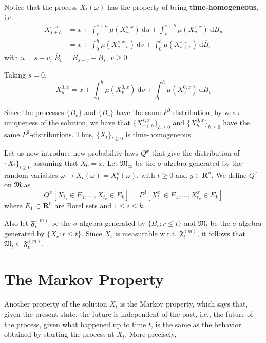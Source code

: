 Notice that the process $X_t(\omega)$ has the property of being \textbf{time-homogeneous}, i.e. 
\begin{equation*}
    \begin{aligned}
        X_{s+h}^{s,x} &= x + \int_s^{s+h} \mu(X_u^{s,x})~\mathrm{d}u + \int_s^{s+h} \mu(X_u^{s,x})~\mathrm{d}B_u \\
        &= x + \int_0^{h} \mu(X_{s+v}^{s,x})~\mathrm{d}v + \int_0^{h} \mu(X_{s+v}^{s,x})~\mathrm{d}\overline{B}_v
    \end{aligned} 
\end{equation*}
with $u = s+v$, $\overline{B}_v = B_{s+v} - B_s$, $v \geq 0$. 

Taking $s = 0$, 
\[
    X_{h}^{0,x} = x + \int_0^{h} \mu(X_{v}^{0,x})~\mathrm{d}v + \int_0^{h} \mu(X_{v}^{0,x})~\mathrm{d}B_v
\]

Since the processes $\{ \overline{B}_v \}$ and $\{ B_v \}$ have the same $P^0$-distribution, by weak uniqueness of the solution, we have that $\{ X_{s+h}^{s,x} \}_{h \geq 0}$ and $\{ X_h^{0,x} \}_{h \geq 0}$ have the same $P^0$-distributions. Thus, $\{ X_t \}_{t \geq 0}$ is time-homogeneous. 

Let us now introduce new probability laws $Q^x$ that give the distribution of $\{ X_t \}_{t \geq 0}$ assuming that $X_0 = x$. Let $\mathfrak{M}_\infty$ be the $\sigma$-algebra generated by the random variables $\omega \longrightarrow X_t(\omega) = X_t^y(\omega)$, with $t \geq 0$ and $y \in \textbf{R}^n$. We define $Q^x$ on $\mathfrak{M}$ as
\[
    Q^x [X_{t_1} \in E_1, \ldots, X_{t_k} \in E_k] = P^0[X_{t_1}^x \in E_1, \ldots, X_{t_k}^x \in E_k]
\]
where $E_1 \subset \textbf{R}^n$ are Borel sets and $1 \leq i \leq k$. 

Also let $\mathfrak{F}_t^{(m)}$ be the $\sigma$-algebra generated by $\{ B_r : r \leq t\}$ and $\mathfrak{M}_t$ be the $\sigma$-algebra generated by $\{ X_r : r \leq t\}$. Since $X_t$ is measurable w.r.t. $\mathfrak{F}_t^{(m)}$, it follows that $\mathfrak{M}_t \subseteq \mathfrak{F}_t^{(m)}$.

\section{The Markov Property}

Another property of the solution $X_t$ is the Markov property, which says that, given the present state, the future is independent of the past, i.e., the future of the process, given what happened up to time $t$, is the same as the behavior obtained by starting the process at $X_t$. More precisely, 

